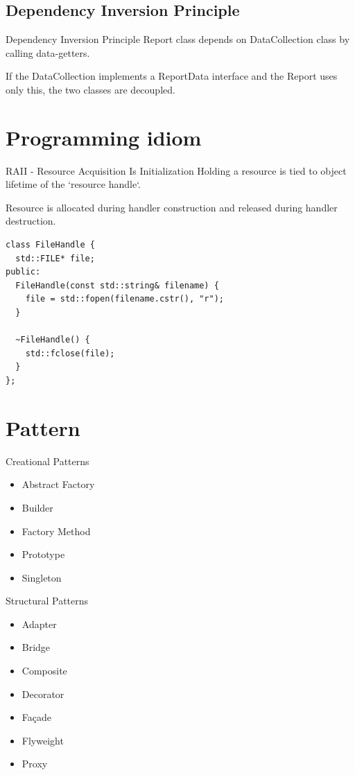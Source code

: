 \documentclass{beamer}
\begin{document}
\subsection{Dependency Inversion Principle}

\begin{frame}{Dependency Inversion Principle}
Report class depends on DataCollection class by calling data-getters.

If the DataCollection implements a ReportData interface and the Report uses only
this, the two classes are decoupled.
\end{frame}

\section{Programming idiom}
\begin{frame}[fragile]{RAII - Resource Acquisition Is Initialization}
Holding a resource is tied to object lifetime of the `resource handle`.
\par
Resource is allocated during handler construction and released during handler
destruction.

\begin{lstlisting}
class FileHandle {
  std::FILE* file;
public:
  FileHandle(const std::string& filename) {
    file = std::fopen(filename.cstr(), "r");
  }
  
  ~FileHandle() {
    std::fclose(file);
  }
};
\end{lstlisting}
\end{frame}

\section{Pattern}

\begin{frame}{Creational Patterns}
\begin{itemize}
  \item Abstract Factory
  \item Builder
  \item Factory Method
  \item Prototype
  \item Singleton
\end{itemize}
\end{frame}

\begin{frame}{Structural Patterns}
\begin{itemize}
  \item Adapter
  \item Bridge
  \item Composite
  \item Decorator
  \item Façade
  \item Flyweight
  \item Proxy
\end{itemize}
\end{frame}
\end{document}
